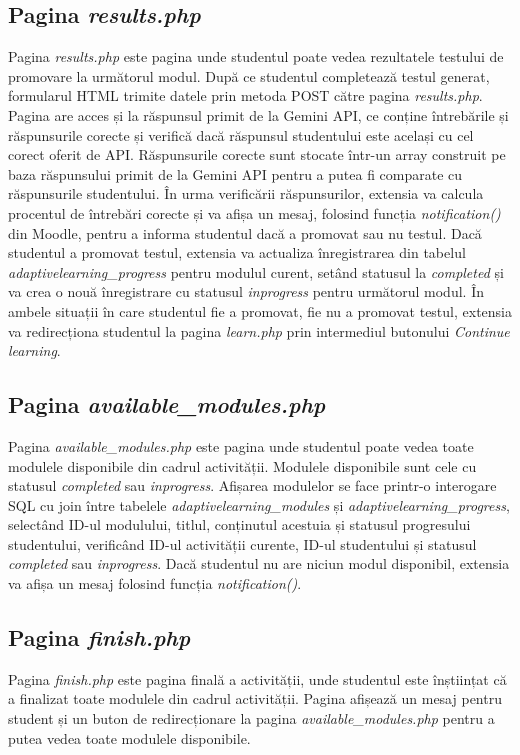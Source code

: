\subsection{Pagina \textit{results.php}}
Pagina \textit{results.php} este pagina unde studentul poate vedea rezultatele testului de promovare la următorul modul. După ce studentul completează testul generat, formularul HTML trimite 
datele prin metoda POST către pagina \textit{results.php}. Pagina are acces și la răspunsul primit de la Gemini API, ce conține întrebările și răspunsurile corecte și verifică dacă răspunsul 
studentului este același cu cel corect oferit de API. Răspunsurile corecte sunt stocate într-un array construit pe baza răspunsului primit de la Gemini API pentru a putea fi comparate cu
răspunsurile studentului. În urma verificării răspunsurilor, extensia va calcula procentul de întrebări corecte și va afișa un mesaj, folosind funcția \textit{notification()} din Moodle, 
pentru a informa studentul dacă a promovat sau nu testul. Dacă studentul a promovat testul, extensia va actualiza înregistrarea din tabelul \textit{adaptivelearning\_progress} pentru modulul 
curent, setând statusul la \textit{completed} și va crea o nouă înregistrare cu statusul \textit{inprogress} pentru următorul modul. În ambele situații în care studentul fie a promovat, fie 
nu a promovat testul, extensia va redirecționa studentul la pagina \textit{learn.php} prin intermediul butonului \textit{Continue learning}.

\subsection{Pagina \textit{available\_modules.php}}
Pagina \textit{available\_modules.php} este pagina unde studentul poate vedea toate modulele disponibile din cadrul activității. Modulele disponibile sunt cele cu statusul
\textit{completed} sau \textit{inprogress}. Afișarea modulelor se face printr-o interogare SQL cu join între tabelele \textit{adaptivelearning\_modules} și 
\textit{adaptivelearning\_progress}, selectând ID-ul modulului, titlul, conținutul acestuia și statusul progresului studentului, verificând ID-ul activității curente, ID-ul studentului 
și statusul \textit{completed} sau \textit{inprogress}. Dacă studentul nu are niciun modul disponibil, extensia va afișa un mesaj folosind funcția \textit{notification()}.

\subsection{Pagina \textit{finish.php}}
Pagina \textit{finish.php} este pagina finală a activității, unde studentul este înștiințat că a finalizat toate modulele din cadrul activității. Pagina afișează un mesaj pentru student 
și un buton de redirecționare la pagina \textit{available\_modules.php} pentru a putea vedea toate modulele disponibile.

